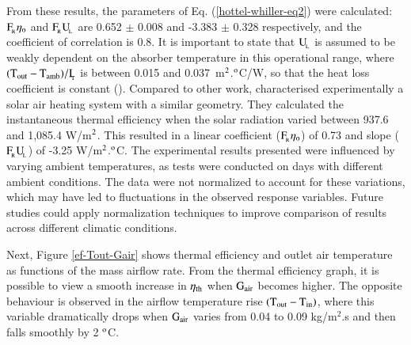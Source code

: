 \newpage
From these results, the parameters of Eq. (\ref{hottel-whiller-eq2}) were calculated: $\rm{F_{\!_R}}\eta_{\rm{o}}$ and $\rm{F_{\!_R}{U_{\!_L}}}$ are 0.652 $\pm$ 0.008 and -3.383 $\pm$ 0.328 respectively, and the coefficient of correlation is 0.8. It is important to state that $\rm{U_{\!_L}}$ is assumed to be weakly dependent on the absorber temperature in this operational range, where $\rm{(T_{out} - T_{amb})/I_{\!_T}}$ is between 0.015 and 0.037~m$^{\rm{2}}$.$^{\rm{o}}$C/W, so that the heat loss coefficient is constant (\cite{Rabl1985}). Compared to other work, \citet{Shams2016} characterised experimentally a solar air heating system with a similar geometry. They calculated the instantaneous thermal efficiency when the solar radiation varied between 937.6 and 1,085.4 W/m$^{\rm{2}}$. This resulted in a linear coefficient ($\rm{F_{\!_R}}\eta_{\rm{o}}$) of 0.73 and slope ($\rm{F_{\!_R}{U_{\!_L}}}$) of -3.25 W/m$^{\rm{2}}$.$^{\rm{o}}$C. The experimental results presented were influenced by varying ambient temperatures, as tests were conducted on days with different ambient conditions. The data were not normalized to account for these variations, which may have led to fluctuations in the observed response variables. Future studies could apply normalization techniques to improve comparison of results across different climatic conditions.

Next, Figure \ref{ef-Tout-Gair} shows thermal efficiency and outlet air temperature as functions of the mass airflow rate. From the thermal efficiency graph, it is possible to view a smooth increase in $\eta_{\rm{th}}$ when $\rm{G_{air}}$ becomes higher. The opposite behaviour is observed in the airflow temperature rise $(\rm{T_{out}} - \rm{T_{in}})$, where this variable dramatically drops when $\rm{G_{air}}$ varies from 0.04 to 0.09 kg/m$^2$.s and then falls smoothly by 2 $^{\rm{o}}$C.

